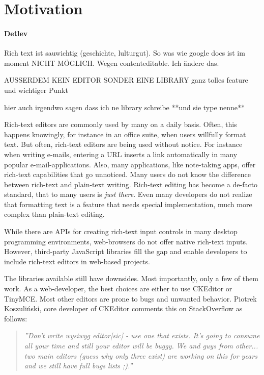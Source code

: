 \section{Motivation}

\paragraph{Detlev} Rich text ist sauwichtig (geschichte, lulturgut). So was wie google docs ist im moment NICHT MÖGLICH. Wegen contenteditable. Ich ändere das.

AUSSERDEM KEIN EDITOR SONDER EINE LIBRARY ganz tolles feature und wichtiger Punkt

hier auch irgendwo sagen dass ich ne library schreibe **und sie type nenne**

Rich-text editors are commonly used by many on a daily basis. Often, this happens knowingly, for instance in an office suite, when users willfully format text. But often, rich-text editors are being used without notice. For instance when writing e-mails, entering a URL inserts a link automatically in many popular e-mail-applications. Also, many applications, like note-taking apps, offer rich-text capabilities that go unnoticed. Many users do not know the difference between rich-text and plain-text writing. Rich-text editing has become a de-facto standard, that to many users is \textit{just there}. Even many developers do not realize that formatting text is a feature that needs special implementation, much more complex than plain-text editing.

While there are APIs for creating rich-text input controls in many desktop programming environments, web-browsers do not offer native rich-text inputs. However, third-party JavaScript libraries fill the gap and enable developers to include rich-text editors in web-based projects.

The libraries available still have downsides. Most importantly, only a few of them work. As a web-developer, the best choices are either to use CKEditor or TinyMCE. Most other editors are prone to bugs and unwanted behavior. Piotrek Koszuli\'{n}ski, core developer of CKEditor comments this on StackOverflow as follows:

\begin{quotation}
\textit{''Don't write wysiwyg editor[sic] - use one that exists. It's going to consume all your time and still your editor will be buggy. We and guys from other... two main editors (guess why only three exist) are working on this for years and we still have full bugs lists ;).\cite{sopp}''}
\end{quotation} %

